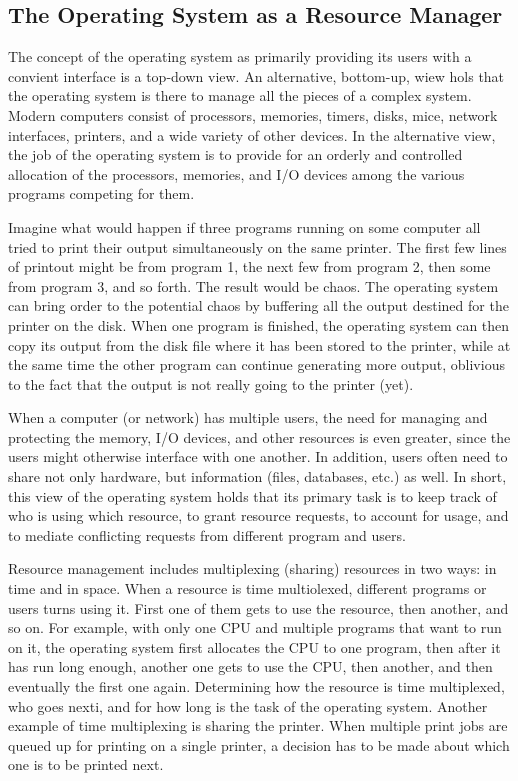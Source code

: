 \documentclass{book}
\begin{document}
\subsection{The Operating System as a Resource Manager}
The concept of the operating system as primarily providing its users with a convient interface is a top-down view.
An alternative, bottom-up, wiew hols that the operating system is there to manage all the pieces of a complex system. 
Modern computers consist of processors, memories, timers, disks, mice, network interfaces, printers, and a wide variety of other devices.
In the alternative view, the job of the operating system is to provide for an orderly and controlled allocation 
of the processors, memories, and I/O devices among the various programs competing for them.

Imagine what would happen if three programs running on some computer all tried to print their output simultaneously on the same printer.
The first few lines of printout might be from program 1, the next few from program 2, then some from program 3, and so forth.
The result would be chaos.
The operating system can bring order to the potential chaos by buffering all the output destined for the printer on the disk.
When one program is finished, the operating system can then copy its output from the disk file where it has been stored to the printer, 
while at the same time the other program can continue generating more output, 
oblivious to the fact that the output is not really going to the printer (yet).

When a computer (or network) has multiple users, the need for managing and protecting the memory, I/O devices, and other resources is even greater, 
since the users might otherwise interface with one another.
In addition, users often need to share not only hardware, but information (files, databases, etc.) as well.
In short, this view of the operating system holds that its primary task is to keep track of who is using which resource, 
to grant resource requests, to account for usage, and to mediate conflicting requests from different program and users.

Resource management includes multiplexing (sharing) resources in two ways: in time and in space.
When a resource is time multiolexed, different programs or users turns using it.
First one of them gets to use the resource, then another, and so on.
For example, with only one CPU and multiple programs that want to run on it, the operating system first allocates the CPU to one program, 
then after it has run long enough, another one gets to use the CPU, then another, and then eventually the first one again.
Determining how the resource is time multiplexed, who goes nexti,  and for how long is the task of the operating system.
Another example of time multiplexing is sharing the printer.
When multiple print jobs are queued up for printing on a single printer, a decision has to be made about which one is to be printed next.
\end{document}
